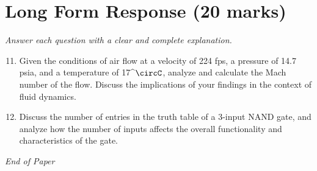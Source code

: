 \documentclass[12pt]{article}
\begin{document}
\section*{Long Form Response (20 marks)}
\textit{Answer each question with a clear and complete explanation.}
\begin{enumerate}[label=\arabic*.]
\setcounter{enumi}{10}
\item Given the conditions of air flow at a velocity of 224 fps, a pressure of 14.7 psia, and a temperature of 17^\ensuremath{\circC}, analyze and calculate the Mach number of the flow. Discuss the implications of your findings in the context of fluid dynamics.
\item Discuss the number of entries in the truth table of a 3-input NAND gate, and analyze how the number of inputs affects the overall functionality and characteristics of the gate.
\end{enumerate}

\vfill
\noindent\textit{End of Paper}
\end{document}
